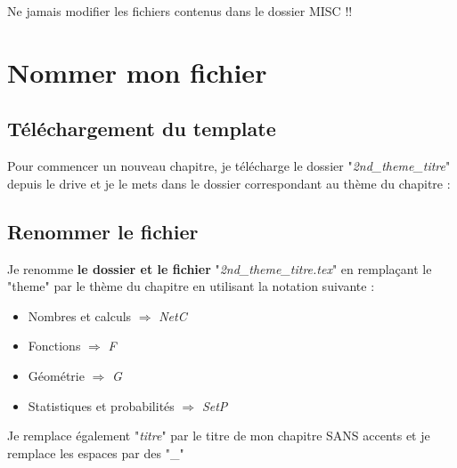 \begin{pageCours} %
%
%

\begin{Att}
Ne jamais modifier les fichiers contenus dans le dossier MISC !!
\end{Att}

\section{Nommer mon fichier}

\subsection{Téléchargement du template}

Pour commencer un nouveau chapitre, je télécharge le dossier "\textit{2nd\_theme\_titre}" depuis le drive et je le mets dans le dossier correspondant au thème du chapitre :


\subsection{Renommer le fichier}

Je renomme \textbf{le dossier et le fichier} "\textit{2nd\_theme\_titre.tex}" en remplaçant le "theme" par le thème du chapitre en utilisant la notation suivante :
\begin{itemize}
\item Nombres et calculs $\Longrightarrow$ \textit{NetC}
\item Fonctions $\Longrightarrow$ \textit{F}
\item Géométrie $\Longrightarrow$ \textit{G}
\item Statistiques et probabilités $\Longrightarrow$ \textit{SetP}
\end{itemize}
Je remplace également "\textit{titre}" par le titre de mon chapitre SANS accents et je remplace les espaces par des "\_"


\end{pageCours}
